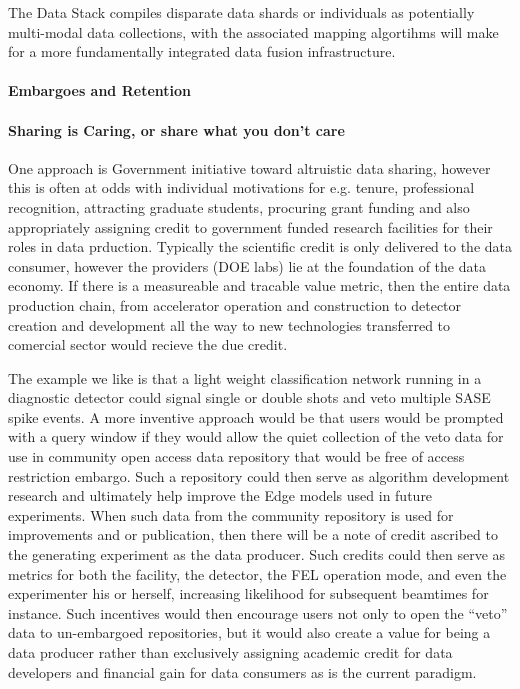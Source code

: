 \documentclass{article}
\begin{document}
The Data Stack compiles disparate data shards or individuals as potentially multi-modal data collections, with the associated mapping algortihms will make for a more fundamentally integrated data fusion infrastructure.

\paragraph{Embargoes and Retention}

\paragraph{Sharing is Caring, or share what you don't care}

One approach is Government initiative toward altruistic data sharing, however this is often at odds with individual motivations for e.g. tenure, professional recognition, attracting graduate students, procuring grant funding and also appropriately assigning credit to government funded research facilities for their roles in data prduction.  Typically the scientific credit is only delivered to the data consumer, however the providers (DOE labs) lie at the foundation of the data economy.
If there is a measureable and tracable value metric, then the entire data production chain, from accelerator operation and construction to detector creation and development all the way to new technologies transferred to comercial sector would recieve the due credit.

The example we like is that a light weight classification network running in a diagnostic detector could signal single or double shots and veto multiple SASE spike events.
A more inventive approach would be that users would be prompted with a query window if they would allow the quiet collection of the veto data for use in community open access data repository that would be free of access restriction embargo.
Such a repository could then serve as algorithm development research and ultimately help improve the Edge models used in future experiments.
When such data from the community repository is used for improvements and or publication, then there will be a note of credit ascribed to the generating experiment as the data producer.
Such credits could then serve as metrics for both the facility, the detector, the FEL operation mode, and even the experimenter his or herself, increasing likelihood for subsequent beamtimes for instance.
Such incentives would then encourage users not only to open the ``veto'' data to un-embargoed repositories, but it would also create a value for being a data producer rather than exclusively assigning academic credit for data developers and financial gain for data consumers as is the current paradigm.
\end{document}
